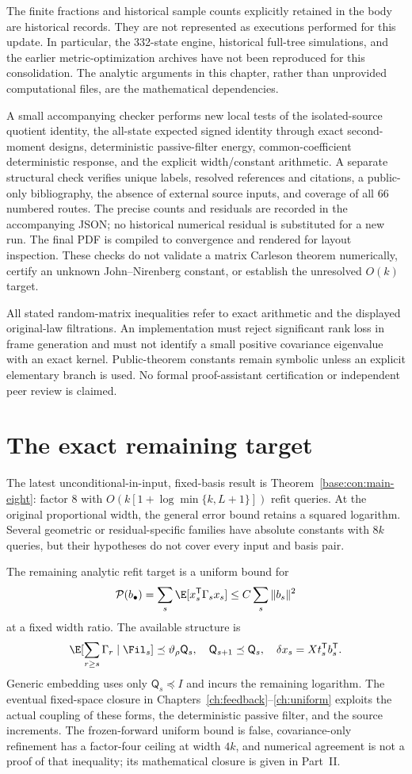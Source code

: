 \documentclass[11pt,oneside,openany,a4paper]{book}
\numberwithin{equation}{chapter}
\theoremstyle{definition}
\theoremstyle{remark}
\newcommand{\T}{\mathsf T}\newcommand{\Id}{I}
\begin{document}
The finite fractions and historical sample counts explicitly retained in the body are historical records. They are not represented as executions performed for this update. In particular, the 332-state engine, historical full-tree simulations, and the earlier metric-optimization archives have not been reproduced for this consolidation. The analytic arguments in this chapter, rather than unprovided computational files, are the mathematical dependencies.

A small accompanying checker performs new local tests of the isolated-source quotient identity, the all-state expected signed identity through exact second-moment designs, deterministic passive-filter energy, common-coefficient deterministic response, and the explicit width/constant arithmetic. A separate structural check verifies unique labels, resolved references and citations, a public-only bibliography, the absence of external source inputs, and coverage of all 66 numbered routes. The precise counts and residuals are recorded in the accompanying JSON; no historical numerical residual is substituted for a new run. The final PDF is compiled to convergence and rendered for layout inspection. These checks do not validate a matrix Carleson theorem numerically, certify an unknown John--Nirenberg constant, or establish the unresolved $O(k)$ target.

All stated random-matrix inequalities refer to exact arithmetic and the displayed original-law filtrations. An implementation must reject significant rank loss in frame generation and must not identify a small positive covariance eigenvalue with an exact kernel. Public-theorem constants remain symbolic unless an explicit elementary branch is used. No formal proof-assistant certification or independent peer review is claimed.

\section{The exact remaining target}\label{base:new:remaining}
The latest unconditional-in-input, fixed-basis result is Theorem~\ref{base:con:main-eight}: factor $8$ with
$O(k[1+\log\min\{k,L+1\}])$ refit queries. At the original proportional width, the general error bound retains a squared logarithm. Several geometric or residual-specific families have absolute constants with $8k$ queries, but their hypotheses do not cover every input and basis pair.

The remaining analytic refit target is a uniform bound for
\[
 \mathcal P(b_\bullet)=\sum_s\E[x_s^\T\Gamma_sx_s]
 \le C\sum_s\|b_s\|^2
\]
at a fixed width ratio. The available structure is
\[
 \E[\sum_{r\ge s}\Gamma_r\mid\Fil_s]\preceq\vartheta_\rho\mathsf Q_s,
 \quad\mathsf Q_{s+1}\preceq\mathsf Q_s,
 \quad\delta x_s=Xt_s^\T b_s^\T.
\]
Generic embedding uses only $\mathsf Q_s\preceq I$ and incurs the remaining logarithm. The eventual fixed-space closure in Chapters~\ref{ch:feedback}--\ref{ch:uniform} exploits the actual coupling of these forms, the deterministic passive filter, and the source increments. The frozen-forward uniform bound is false, covariance-only refinement has a factor-four ceiling at width $4k$, and numerical agreement is not a proof of that inequality; its mathematical closure is given in Part~II.
\end{document}
